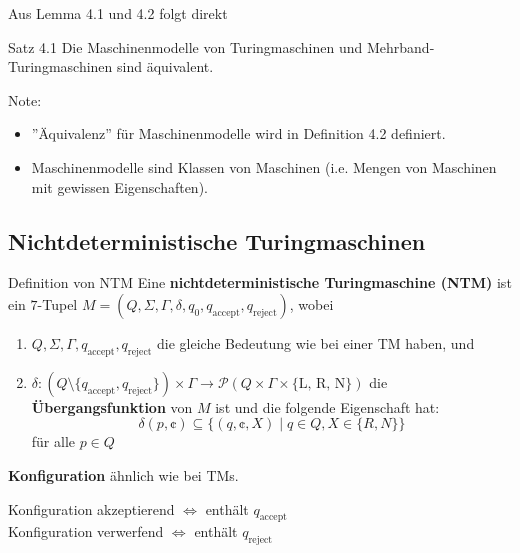         Aus Lemma 4.1 und 4.2 folgt direkt
        \begin{mainbox}{Satz 4.1}
            Die Maschinenmodelle von Turingmaschinen und Mehrband-Turingmaschinen sind äquivalent.
        \end{mainbox}
        Note: 
        \begin{itemize}
            \item ''Äquivalenz'' für Maschinenmodelle wird in Definition 4.2 definiert.
            \item Maschinenmodelle sind Klassen von Maschinen (i.e. Mengen von Maschinen mit gewissen Eigenschaften).
        \end{itemize}
    
        \subsection{Nichtdeterministische Turingmaschinen}
            \begin{mainbox}{Definition von NTM}
                Eine \textbf{nichtdeterministische Turingmaschine (NTM)} ist ein $7$-Tupel $M = (Q, \Sigma, \Gamma, \delta, q_0, q_{\text{accept}}, q_{\text{reject}})$, wobei 
                \begin{enumerate}[label=(\roman*)]
                    \item $Q, \Sigma, \Gamma, q_{\text{accept}}, q_{\text{reject}}$ die gleiche Bedeutung wie bei einer TM haben, und
                    \item $\delta: (Q \setminus \{q_{\text{accept}}, q_{\text{reject}}\}) \times \Gamma \to \mathcal{P}(Q \times \Gamma \times \{\text{L, R, N}\})$ 
                    die \textbf{Übergangsfunktion} von $M$ ist und die folgende Eigenschaft hat:
                    $$\delta(p, \cent) \subseteq \{(q, \cent, X) \mid q \in Q, X \in \{R, N\}\}$$
                    für alle $p \in Q$
                \end{enumerate}
            \end{mainbox}
            \textbf{Konfiguration} ähnlich wie bei TMs.
            \begin{center}
                Konfiguration akzeptierend $\iff$ enthält $q_{\text{accept}}$\\
                Konfiguration verwerfend $\iff$ enthält $q_{\text{reject}}$
            \end{center}
        
        
        

